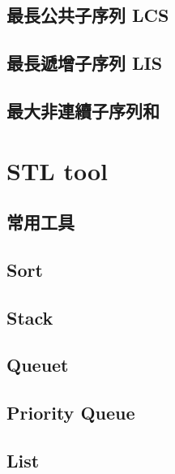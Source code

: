 \subsection{最長公共子序列 LCS}


\subsection{最長遞增子序列 LIS}


\subsection{最大非連續子序列和}






\section{STL tool}

\subsection{常用工具}


\subsection{Sort}


\subsection{Stack}


\subsection{Queuet}


\subsection{Priority Queue}


\subsection{List}


